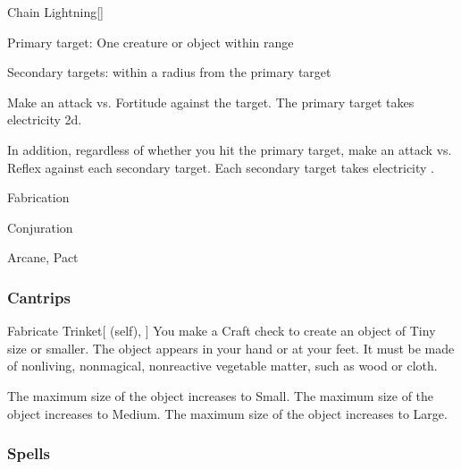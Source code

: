 \lowercase{\hypertarget{spell:Chain Lightning}{}}\label{spell:Chain Lightning}
\begin{freeability}[Rank 5]{\hypertarget{spell:Chain Lightning}{Chain Lightning}}[]

Primary target: One creature or object within \rngmed range
\par\noindent
Secondary targets:  within a \areasmall radius from the primary target

Make an attack vs. Fortitude against the target.
\hit The primary target takes electricity  \plus2d.

In addition, regardless of whether you hit the primary target, make an attack vs. Reflex against each secondary target.
\hit Each secondary target takes electricity .
\end{freeability}
\vspace{0.25em}


\newpage
\begin{spellsection}{Fabrication}

\begin{spellheader}
\end{spellheader}


 Conjuration

 Arcane, Pact

\subsubsection{Cantrips}


\begin{attuneability}{Fabricate Trinket}[ (self), ]
You make a Craft check to create an object of Tiny size or smaller.
The object appears in your hand or at your feet.
It must be made of nonliving, nonmagical, nonreactive vegetable matter, such as wood or cloth.

\rankline
{} The maximum size of the object increases to Small.
 The maximum size of the object increases to Medium.
 The maximum size of the object increases to Large.
\end{attuneability}

\end{spellsection}


\subsubsection{Spells}


